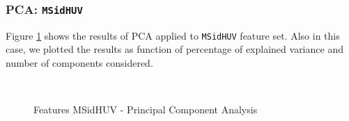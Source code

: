\vspace{0.5cm}


\subsubsection{PCA: \texttt{MSidHUV}}

Figure \ref{ch6:fig16} shows the results of \Gls{PCA} applied to \texttt{MSidHUV} feature set. Also in this case, we plotted the results as function of percentage of
explained variance and number of components considered.

\begin{figure}[!htb]
  \centering
    \\
    \caption{Features MSidHUV - Principal Component Analysis}
    \label{ch6:fig16}
\end{figure}


